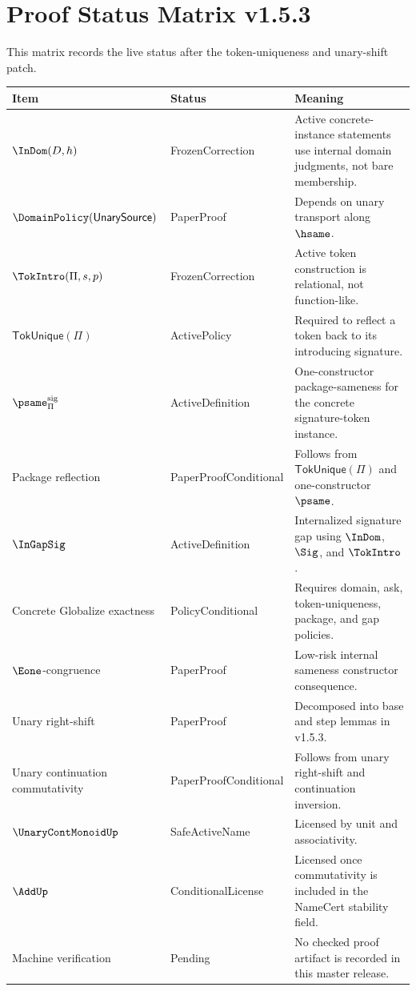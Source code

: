 \chapter{Proof Status Matrix v1.5.3}
\label{ch:v153-status-matrix}

This matrix records the live status after the token-uniqueness and unary-shift patch.

\begin{longtable}{p{}p{}p{}}
\toprule
\textbf{Item} & \textbf{Status} & \textbf{Meaning}\\
\midrule
\(\InDom(D,h)\) & FrozenCorrection & Active concrete-instance statements use internal domain judgments, not bare membership.\\
\(\DomainPolicy(\mathsf{UnarySource})\) & PaperProof & Depends on unary transport along \(\hsame\).\\
\(\TokIntro(\Pi,s,p)\) & FrozenCorrection & Active token construction is relational, not function-like.\\
\(\mathsf{TokUnique}(\Pi)\) & ActivePolicy & Required to reflect a token back to its introducing signature.\\
\(\psame_{\Pi}^{\mathrm{sig}}\) & ActiveDefinition & One-constructor package-sameness for the concrete signature-token instance.\\
Package reflection & PaperProofConditional & Follows from \(\mathsf{TokUnique}(\Pi)\) and one-constructor \(\psame\).\\
\(\InGapSig\) & ActiveDefinition & Internalized signature gap using \(\InDom\), \(\Sig\), and \(\TokIntro\).\\
Concrete Globalize exactness & PolicyConditional & Requires domain, ask, token-uniqueness, package, and gap policies.\\
\(\Eone\)-congruence & PaperProof & Low-risk internal sameness constructor consequence.\\
Unary right-shift & PaperProof & Decomposed into base and step lemmas in v1.5.3.\\
Unary continuation commutativity & PaperProofConditional & Follows from unary right-shift and continuation inversion.\\
\(\UnaryContMonoidUp\) & SafeActiveName & Licensed by unit and associativity.\\
\(\AddUp\) & ConditionalLicense & Licensed once commutativity is included in the NameCert stability field.\\
Machine verification & Pending & No checked proof artifact is recorded in this master release.\\
\bottomrule
\end{longtable}

